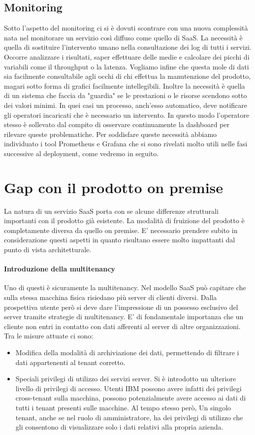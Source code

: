\subsection{Monitoring}
Sotto l'aspetto del monitoring ci si è dovuti scontrare con una nuova complessità nata nel monitorare un servizio così diffuso come quello di SaaS. La necessità è quella di sostituire l'intervento umano nella consultazione dei log di tutti i servizi. Occorre analizzare i risultati, saper effettuare delle medie e calcolare dei picchi di variabili come il throughput o la latenza. Vogliamo infine che questa mole di dati sia facilmente consultabile agli occhi di chi effettua la manutenzione del prodotto, magari sotto forma di grafici facilmente intellegibili. Inoltre la necessità è quella di un sistema che faccia da "guardia" se le prestazioni o le risorse scendono sotto dei valori minimi. In quei casi un processo, anch'esso automatico, deve notificare gli operatori incaricati che è necessario un intervento. In questo modo l'operatore stesso è sollevato dal compito di osservare continuamente la dashboard per rilevare queste problematiche. Per soddisfare queste necessità abbiamo individuato i tool Prometheus e Grafana che si sono rivelati molto utili nelle fasi successive al deployment, come vedremo in seguito.  

\section{Gap con il prodotto on premise}
La natura di un servizio SaaS porta con se alcune differenze strutturali importanti con il prodotto già esistente. La modalità di fruizione del prodotto è completamente diversa da quello on premise. E' necessario prendere subito in considerazione questi aspetti in quanto risultano essere molto impattanti dal punto di vista architetturale.
\paragraph{Introduzione della multitenancy}
Uno di questi è sicuramente la multitenancy. Nel modello SaaS può capitare che sulla stessa macchina fisica risiedano più server di clienti diversi. Dalla prospettiva utente però si deve dare l'impressione di un possesso esclusivo del server tramite strategie di multitenancy. E' di fondamentale importanza che un cliente non entri in contatto con dati afferenti al server di altre organizzazioni. Tra le misure attuate ci sono:
\begin{itemize}
	\item Modifica della modalità di archiviazione dei dati, permettendo di filtrare i dati appartenenti al tenant corretto.
	\item Speciali privilegi di utilizzo dei servizi server. Si è introdotto un ulteriore livello di privilegi di accesso. Utenti IBM possono avere infatti dei privilegi cross-tenant sulla macchina, possono potenzialmente avere accesso ai dati di tutti i tenant presenti sulle macchine. Al tempo stesso però, Un singolo tenant, anche se nel ruolo di amministratore, ha dei privilegi di utilizzo che gli consentono di visualizzare solo i dati relativi alla propria azienda.
\end{itemize}
